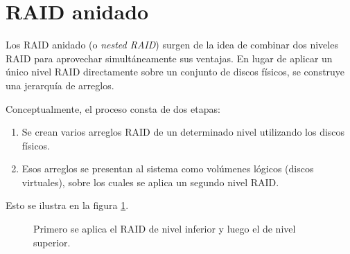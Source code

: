









\section{RAID anidado}

Los RAID anidado (o \emph{nested RAID}) surgen de la idea de combinar dos niveles RAID para aprovechar simultáneamente sus ventajas. En lugar de aplicar un único nivel RAID directamente sobre un conjunto de discos físicos, se construye una jerarquía de arreglos.

Conceptualmente, el proceso consta de dos etapas:
\begin{enumerate}
  \item Se crean varios arreglos RAID de un determinado nivel utilizando los discos físicos.
  \item Esos arreglos se presentan al sistema como volúmenes lógicos (discos virtuales), sobre los cuales se aplica un segundo nivel RAID.
\end{enumerate}
Esto se ilustra en la figura \ref{fig:raid_anidado}.

\begin{figure}[!ht]
  \centering
  \caption{Primero se aplica el RAID de nivel inferior y luego el de nivel superior.}
  \label{fig:raid_anidado}
\end{figure}

